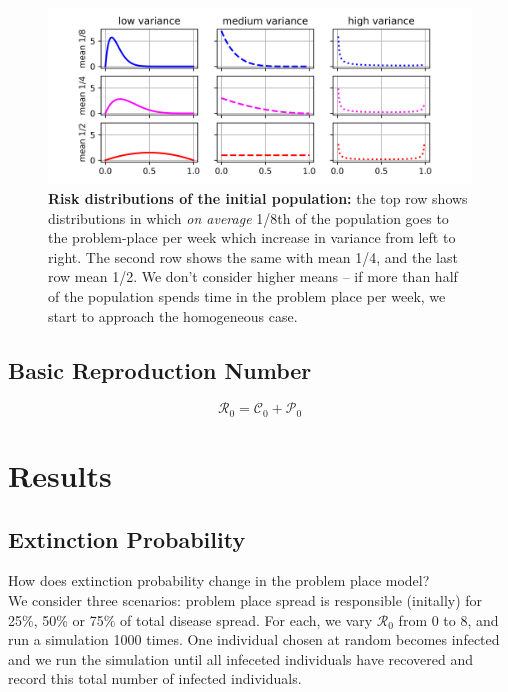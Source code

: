 \documentclass{article}
\begin{document}
\begin{figure}
\centering
\includegraphics[width=\textwidth]{risk_distributions}
\caption{\textbf{Risk distributions of the initial population:} the top row
shows distributions in which \textit{on average} 1/8th of the population
goes to the problem-place per week which increase in variance from left to
right. The second row shows the same with mean 1/4, and the last row mean 
1/2. We don't consider higher means – if more than half of the population
spends time in the problem place per week, we start to approach the homogeneous
case. }
\label{fig:risk_distributions}
\end{figure}

\subsection{Basic Reproduction Number}

$$\mathcal{R}_0 = \mathcal{C}_0 + \mathcal{P}_0$$


\section{Results}
\subsection{Extinction Probability}


How does extinction probability change in the problem place model?\\

We consider three scenarios: problem place spread is responsible (initally)
for 25\%, 50\% or 75\% of total disease spread. For each, we vary $\mathcal{R}_0$
from 0 to 8, and run a simulation 1000 times. One individual chosen
at random becomes infected and we run the simulation until all infeceted
individuals have recovered and record this total number of infected individuals.\\
\end{document}
